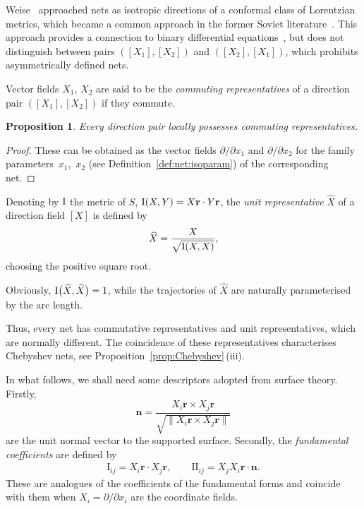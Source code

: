 \documentclass[pdftex]{sigma}
\let\ve\mathbf
\def\I#1#2{\mathrm{I}_{#1#2}}
\def\II#1#2{\mathrm{II}_{#1#2}}
\newtheorem{Proposition}[Theorem]{Proposition}
 { \theoremstyle{definition}
\newtheorem{construction}[Theorem]{Construction}
\newtheorem{Definition}[Theorem]{Definition}
\newtheorem{Example}[Theorem]{Example}
\newtheorem{Remark}[Theorem]{Remark} }
\numberwithin{equation}{section}
\begin{document}
\begin{Remark}
Weise~\cite[Section~1]{KHW-1940} approached nets as isotropic directions
of a conformal class of Lorentzian metrics,
which became a common approach in the former Soviet literature~\cite{VFK-II,APN,VIS}.
This approach provides a connection to binary differential equations~\cite{B-T-1995},
but does not distinguish between pairs $([X_1], [X_2])$ and $([X_2], [X_1])$,
which prohibits asymmetrically defined nets.
\end{Remark}

\begin{Definition}
Vector fields $X_1$, $X_2$ are said to be the
{\it commuting representatives} of a direction pair $([X_1],[X_2])$
if they commute.
\end{Definition}

\begin{Proposition}
Every direction pair locally possesses commuting representatives.
\end{Proposition}

\begin{proof}
These can be obtained as the vector fields
$\partial/\partial x_1$ and $\partial/\partial x_2$ for
the family parameters~$x_1$,~$x_2$
(see Definition~\ref{def:net:isoparam})
of the corresponding net.
\end{proof}

\begin{Definition}
Denoting by ${\rm I}$ the metric of $S$, ${\rm I}(X,Y) = X \ve r \cdot Y \ve r$, the
{\it unit representative} $\widehat{X}$ of a direction field $[X]$ is defined by
\[
\widehat{X} = \frac{X}{\sqrt{{\rm I}(X, X)}},
\]
choosing the positive square root.
\end{Definition}

Obviously, ${\rm I}\bigl(\widehat{X}, \widehat{X}\bigr) = 1$, while the trajectories of $\widehat{X}$
are naturally parameterised by the arc length.

Thus, every net has commutative representatives and unit representatives,
which are normally different.
The coincidence of these representatives characterises Chebyshev nets, see
Proposition~\ref{prop:Chebyshev}\,(iii).

In what follows, we shall need some descriptors adopted from surface theory.
Firstly,
\[
\ve n
 = \frac{X_i \ve r \times X_j \ve r}{\sqrt{\|X_i \ve r \times X_j \ve r\|}}
\]
are the unit normal vector to the supported surface.
Secondly, the {\it fundamental coefficients} are defined by
\begin{gather}\label{eq:I-II}
\I ij = X_i \ve r \cdot X_j \ve r, \qquad
\II ij = X_j X_i \ve r \cdot \ve n.
\end{gather}
These are analogues of the coefficients of the fundamental forms
and coincide with them when $X_i = \partial/\partial x_i$ are the coordinate fields.
\end{document}
